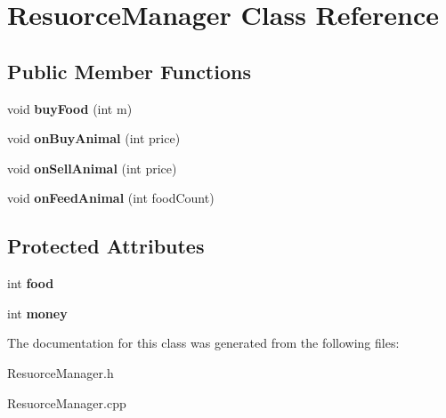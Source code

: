 \hypertarget{class_resuorce_manager}{}\section{Resuorce\+Manager Class Reference}
\label{class_resuorce_manager}
\subsection*{Public Member Functions}
\begin{DoxyCompactItemize}
\item 
\mbox{\label{class_resuorce_manager_a51c3896e31936e5125a91ba56556c08d}} 
void {\bfseries buy\+Food} (int m)
\item 
\mbox{\label{class_resuorce_manager_abca60d0d8bf847f356358c105297720d}} 
void {\bfseries on\+Buy\+Animal} (int price)
\item 
\mbox{\label{class_resuorce_manager_ae86e5e00ad3959b79f4396bea4393f32}} 
void {\bfseries on\+Sell\+Animal} (int price)
\item 
\mbox{\label{class_resuorce_manager_a486a3593838572fe8ca96b1d45a083f1}} 
void {\bfseries on\+Feed\+Animal} (int food\+Count)
\end{DoxyCompactItemize}
\subsection*{Protected Attributes}
\begin{DoxyCompactItemize}
\item 
\mbox{\label{class_resuorce_manager_ab56d204cee3db3f1c0ecd49b457a6de0}} 
int {\bfseries food}
\item 
\mbox{\label{class_resuorce_manager_ab305ccf6a9c242ddfd736baeef1f7463}} 
int {\bfseries money}
\end{DoxyCompactItemize}


The documentation for this class was generated from the following files\+:\begin{DoxyCompactItemize}
\item 
Resuorce\+Manager.\+h\item 
Resuorce\+Manager.\+cpp\end{DoxyCompactItemize}
